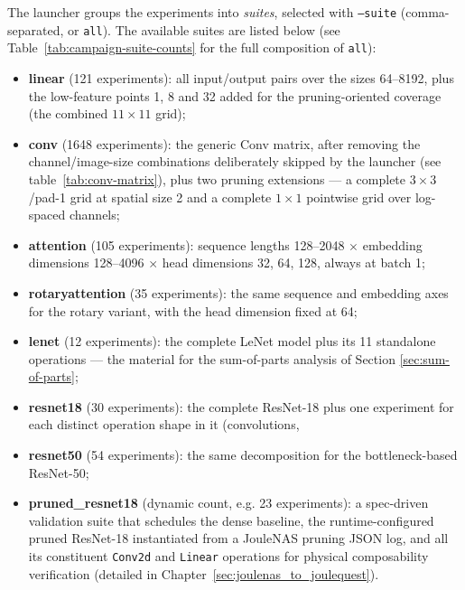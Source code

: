 The launcher groups the experiments into \emph{suites}, selected with
\texttt{--suite} (comma-separated, or \texttt{all}). The available suites
are listed below (see Table~\ref{tab:campaign-suite-counts} for the full composition of \texttt{all}):

\begin{itemize}
    \item \textbf{linear} (121 experiments): all input/output pairs over
    the sizes 64--8192, plus the low-feature points 1, 8 and 32 added for
    the pruning-oriented coverage (the combined $11 \times 11$ grid);
    \item \textbf{conv} (1648 experiments): the generic Conv matrix,
    after removing the channel/image-size combinations deliberately skipped
    by the launcher (see table~\ref{tab:conv-matrix}), plus two pruning extensions --- a complete
    $3{\times}3$/pad-1 grid at spatial size 2 and a complete $1{\times}1$
    pointwise grid over log-spaced channels;
    \item \textbf{attention} (105 experiments): sequence lengths
    128--2048 $\times$ embedding dimensions 128--4096 $\times$ head
    dimensions 32, 64, 128, always at batch 1;
    \item \textbf{rotaryattention} (35 experiments): the same sequence and
    embedding axes for the rotary variant, with the head dimension fixed
    at 64;
    \item \textbf{lenet} (12 experiments): the complete LeNet model plus
    its 11 standalone operations --- the material for the sum-of-parts
    analysis of Section \ref{sec:sum-of-parts};
    \item \textbf{resnet18} (30 experiments): the complete ResNet-18 plus
    one experiment for each distinct operation shape in it (convolutions,
    \item \textbf{resnet50} (54 experiments): the same decomposition for
    the bottleneck-based ResNet-50;
    \item \textbf{pruned\_resnet18} (dynamic count, e.g. 23 experiments): a spec-driven validation suite that schedules the dense baseline, the runtime-configured pruned ResNet-18 instantiated from a JouleNAS pruning JSON log, and all its constituent \texttt{Conv2d} and \texttt{Linear} operations for physical composability verification (detailed in Chapter~\ref{sec:joulenas_to_joulequest}).
\end{itemize}


